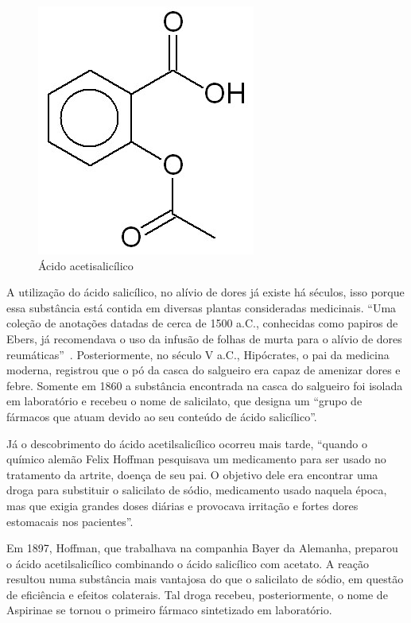 \begin{figure}[H]
\begin{center}
    \includegraphics[scale=.4]{figuras/acido_acetilsalicilico.jpg}
\end{center}
\caption{Ácido acetisalicílico}
\label{fig:acid_AAS}
\end{figure}


A utilização do ácido salicílico, no alívio de dores já existe há séculos, isso porque essa
substância está contida em diversas plantas consideradas medicinais. “Uma coleção de anotações
datadas de cerca de 1500 a.C., conhecidas como papiros de Ebers, já recomendava o uso da infusão de
folhas de murta para o alívio de dores reumáticas”~\cite{aspirinabayer}. Posteriormente, no século V
a.C., Hipócrates, o pai da medicina moderna, registrou que o pó da casca do salgueiro era capaz de
amenizar dores e febre. Somente em 1860 a substância encontrada na casca do salgueiro foi isolada em
laboratório e recebeu o nome de salicilato, que designa um “grupo de fármacos que atuam devido ao
seu conteúdo de ácido salicílico”.~\cite{Goodman2005}

Já o descobrimento do ácido acetilsalicílico ocorreu mais tarde, “quando o químico alemão Felix
Hoffman pesquisava um medicamento para ser usado no tratamento da artrite, doença de seu pai. O
objetivo dele era encontrar uma droga para substituir o salicilato de sódio, medicamento usado
naquela época, mas que exigia grandes doses diárias e provocava irritação e fortes dores estomacais
nos pacientes”.~\cite{massabni2006}

Em 1897, Hoffman, que trabalhava na companhia Bayer da Alemanha, preparou o ácido acetilsalicílico
combinando o ácido salicílico com acetato. A reação resultou numa substância mais vantajosa do que o
salicilato de sódio, em questão de eficiência e efeitos colaterais. Tal droga recebeu,
posteriormente, o nome de Aspirina\R e se tornou o primeiro fármaco sintetizado em laboratório.  

